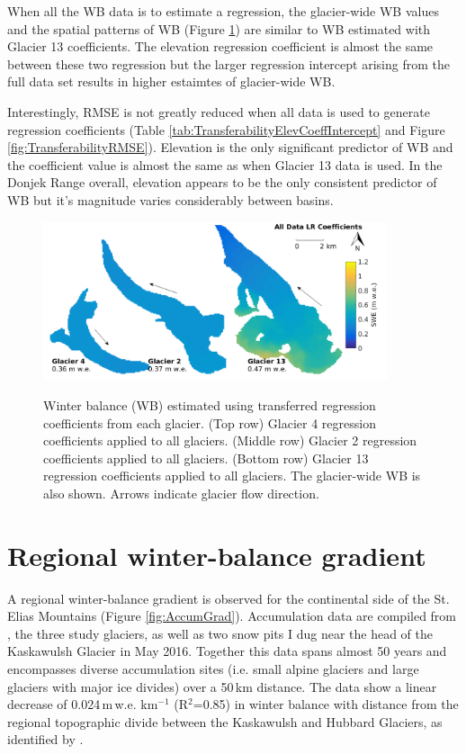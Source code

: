 \documentclass{sfuthesis}
\begin{document}
When all the WB data is to estimate a regression, the glacier-wide WB values and the spatial patterns of WB (Figure \ref{fig:MapTransferabilityComboMean}) are similar to WB estimated with Glacier 13 coefficients. The elevation regression coefficient is almost the same between these two regression but the larger regression intercept arising from the full data set results in higher estaimtes of glacier-wide WB. 

Interestingly, RMSE is not greatly reduced when all data is used to generate regression coefficients (Table \ref{tab:TransferabilityElevCoeffIntercept} and Figure \ref{fig:TransferabilityRMSE}). Elevation is the only significant predictor of WB and the coefficient value is almost the same as when Glacier 13 data is used. In the Donjek Range overall, elevation appears to be the only consistent predictor of WB but it's magnitude varies considerably between basins. 

\begin{figure}
	\centering
	\includegraphics[width =0.9\textwidth]{MapTransferabilityComboCoeffs.png}\\
	\caption{Winter balance (WB) estimated using transferred regression coefficients from each glacier. (Top row) Glacier 4 regression coefficients applied to all glaciers. (Middle row) Glacier 2 regression coefficients applied to all glaciers. (Bottom row) Glacier 13 regression coefficients applied to all glaciers. The glacier-wide WB is also shown. Arrows indicate glacier flow direction.}
	\label{fig:MapTransferabilityComboMean}
\end{figure}


 \section{Regional winter-balance gradient}
 \label{sec:DonjekAccumGrad}

A regional winter-balance gradient is observed for the continental side of the St. Elias Mountains (Figure \ref{fig:AccumGrad}). Accumulation data are compiled from \cite{Taylor1969}, the three study glaciers, as well as two snow pits I dug near the head of the Kaskawulsh Glacier in May 2016. Together this data spans almost 50 years and encompasses diverse accumulation sites (i.e. small alpine glaciers and large glaciers with major ice divides) over a 50\,km distance. The data show a linear decrease of 0.024\,m\,w.e. km$^{-1}$ (R$^2$=0.85) in winter balance with distance from the regional topographic divide between the Kaskawulsh and Hubbard Glaciers, as identified by \cite{Taylor1969}.
\end{document}
